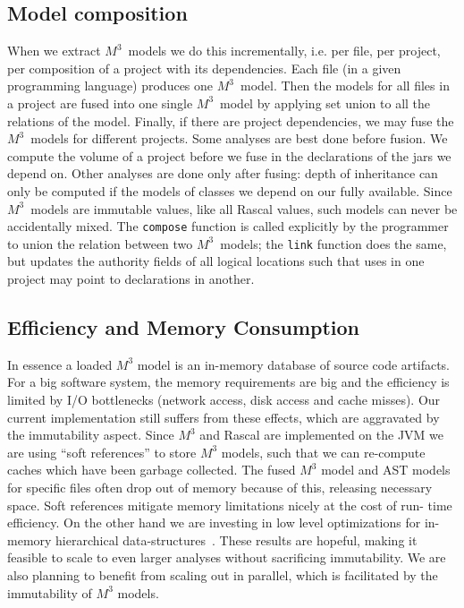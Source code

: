 \documentclass[conference]{IEEEtran}
\newcommand{\mthree}{\ensuremath{M^3}\xspace}
\begin{document}
\subsection{Model composition} When we extract \mthree\  models we do this
incrementally, i.e. per file, per project, per composition of a project with
its dependencies. Each file (in a given programming language) produces one
\mthree\  model. Then the models for all files in a project are fused into one
single \mthree\  model by applying set union to all the relations of the
model. Finally, if there are project dependencies, we may fuse the \mthree\
models for different projects.
%
Some analyses are best done before fusion. We compute the volume of a project
before we fuse in the declarations of the jars we depend on. Other analyses
are done only after fusing: depth of inheritance can only be computed if the
models of classes we depend on our fully available. Since \mthree\  models are
immutable values, like all Rascal values, such models can never be accidentally
mixed. The \texttt{compose} function is called
explicitly by the programmer to union the relation between two \mthree\ models;
the \texttt{link} function does the same, but updates the authority fields
of all logical locations such that uses in one project may point to
declarations in another.


\subsection{Efficiency and Memory Consumption}

In essence a loaded \mthree model is an in-memory database of source code
artifacts. For a big software system, the memory requirements are big and the
efficiency is limited by I/O bottlenecks (network access, disk access and
cache misses). Our current implementation still suffers from these effects,
which are aggravated by the immutability aspect.
%
Since \mthree and Rascal are implemented on the JVM we are using ``soft
references'' to store \mthree models, such that we can re-compute caches which
have been garbage collected. The fused \mthree model and AST models for
specific files often drop out of memory because of this, releasing necessary
space. Soft references mitigate memory limitations nicely at the cost of run-
time efficiency.
%
On the other hand we are investing in low level optimizations for in-memory
hierarchical data-structures~\cite{BJKO00,gpce}. These results are hopeful,
making it feasible to scale to even larger analyses without sacrificing
immutability. We are also planning to benefit from scaling out in parallel,
which is facilitated by the immutability of \mthree models.
\end{document}
